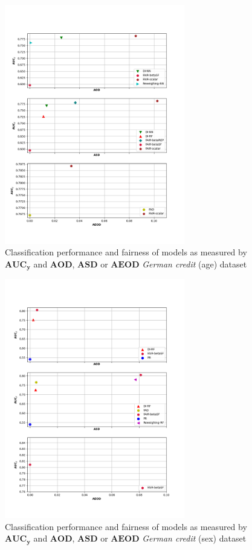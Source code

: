 \documentclass[preprint,12pt]{elsarticle}
\begin{document}
\begin{figure}
	\center
	\includegraphics[angle=0, width=0.7\textwidth]{Ger_age.png}
	\captionsetup{justification=centering}
	\caption{Classification performance and fairness of models as measured by $\mathbf{AUC_y}$ and $\mathbf{AOD}$, $\mathbf{ASD}$ or $\mathbf{AEOD}$ \textit{German credit} (age) dataset}
	\label{fig:Ger-sex-res}
	\vskip -0.2in
\end{figure}

\begin{figure}
	\center
	\includegraphics[angle=0, width=0.7\textwidth]{Ger_sex.png}
	\captionsetup{justification=centering}
	\caption{Classification performance and fairness of models as measured by $\mathbf{AUC_y}$ and $\mathbf{AOD}$, $\mathbf{ASD}$ or $\mathbf{AEOD}$ \textit{German credit} (sex) dataset}
	\label{fig:Ger-age-res}
	\vskip -0.2in
\end{figure} 
\end{document}
